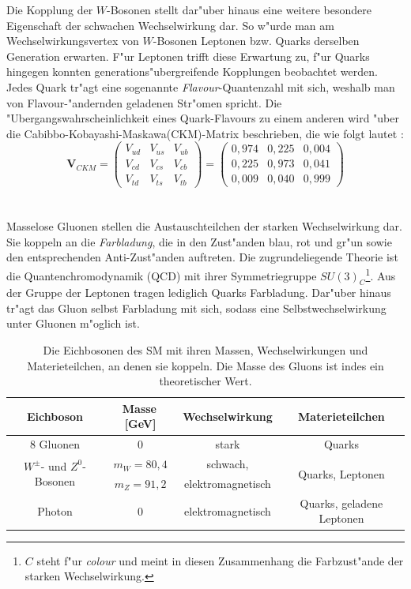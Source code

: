 Die Kopplung der $W$-Bosonen stellt dar"uber hinaus eine weitere besondere Eigenschaft der schwachen Wechselwirkung dar. So w"urde man am Wechselwirkungsvertex von $W$-Bosonen Leptonen bzw. Quarks derselben Generation erwarten. F"ur Leptonen trifft diese Erwartung zu, f"ur Quarks hingegen konnten generations"ubergreifende Kopplungen beo\-bachtet werden. Jedes Quark tr"agt eine sogenannte \textit{Flavour}-Quantenzahl mit sich, weshalb man von Flavour-"andernden geladenen Str"omen spricht. Die "Ubergangswahrscheinlichkeit eines Quark-Flavours zu einem anderen wird "uber die Ca\-bibbo-\-Ko\-ba\-ya\-shi-\-Maska\-wa\-(CKM)-\-Matrix beschrieben, die wie folgt lautet \cite{pdg}:
\begin{equation}
\textbf{V}_{CKM}=\begin{pmatrix} V_{ud} & V_{us} & V_{ub} \\ V_{cd} & V_{cs} & V_{cb} \\ V_{td} & V_{ts} & V_{tb} \end{pmatrix}=\begin{pmatrix} 0,974 & 0,225 & 0,004 \\ 0,225 & 0,973 & 0,041 \\ 0,009 & 0,040 & 0,999 \end{pmatrix}
\label{CKMmatrix}
\end{equation}
\\
\\
Masselose Gluonen stellen die Austauschteilchen der starken Wechselwirkung dar. Sie koppeln an die \textit{Farbladung}, die in den Zust"anden blau, rot und gr"un sowie den entsprechenden Anti-Zust"anden auftreten. Die zugrundeliegende Theorie ist die Quantenchromodynamik (QCD) mit ihrer Symmetriegruppe $SU(3)_{C}$\footnote{$C$ steht f"ur \textit{colour} und meint in diesen Zusammenhang die Farbzust"ande der starken Wechselwirkung.}. Aus der Gruppe der Leptonen tragen lediglich Quarks Farbladung. Dar"uber hinaus tr"agt das Gluon selbst Farbladung mit sich, sodass eine Selbstwechselwirkung unter Gluonen m"oglich ist.
\begin{table}[tp]
\centering
\begin{tabular}{c||c|c|c}
Eichboson & Masse\,[GeV] & Wechselwirkung & Materieteilchen \\ \hline\hline
8 Gluonen & 0 & stark & Quarks \\ \hline
\multirow{2}{*}{$W^{\pm}$- und $Z^{0}$-Bosonen} & $m_{W}=80,4$ & schwach, & \multirow{2}{*}{Quarks, Leptonen} \\
 & $m_{Z}=91,2$ & elektromagnetisch & \\ \hline
Photon & 0 & elektromagnetisch & Quarks, geladene Leptonen\\ \hline
\end{tabular}
	  	\caption{Die Eichbosonen des SM mit ihren Massen, Wechselwirkungen und Materie\-teilchen, an denen sie koppeln. Die Masse des Gluons ist indes ein theo\-re\-tischer Wert.}
	  		\label{Eichbosonen}
\end{table}


